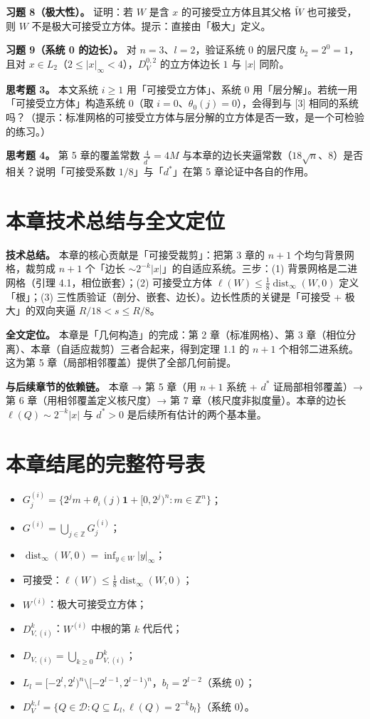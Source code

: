 \documentclass[a4paper,11pt,openany]{ctexbook}
\numberwithin{equation}{chapter}
\numberwithin{figure}{chapter}
\numberwithin{table}{chapter}
\begin{document}
\textbf{习题 8（极大性）。} 证明：若 $W$ 是含 $x$ 的可接受立方体且其父格 $\widetilde W$ 也可接受，则 $W$ 不是极大可接受立方体。提示：直接由「极大」定义。

\textbf{习题 9（系统 0 的边长）。} 对 $n=3$、$l=2$，验证系统 0 的层尺度 $b_2=2^{0}=1$，且对 $x\in L_2$（$2\le|x|_\infty<4$），$D_V^{0,2}$ 的立方体边长 $1$ 与 $|x|$ 同阶。

\textbf{思考题 3。} 本文系统 $i\ge1$ 用「可接受立方体」、系统 0 用「层分解」。若统一用「可接受立方体」构造系统 0（取 $i=0$、$\theta_0(j)=0$），会得到与 [3] 相同的系统吗？（提示：标准网格的可接受立方体与层分解的立方体是否一致，是一个可检验的练习。）

\textbf{思考题 4。} 第 5 章的覆盖常数 $\frac4{d^*}=4M$ 与本章的边长夹逼常数（$18\sqrt n$、$8$）是否相关？说明「可接受系数 $1/8$」与「$d^*$」在第 5 章论证中各自的作用。

\section{本章技术总结与全文定位}

\textbf{技术总结。} 本章的核心贡献是「可接受裁剪」：把第 3 章的 $n+1$ 个均匀背景网格，裁剪成 $n+1$ 个「边长 $\sim2^{-k}|x|$」的自适应系统。三步：(1) 背景网格是二进网格（引理 4.1，相位嵌套）；(2) 可接受立方体 $\ell(W)\le\frac18\operatorname{dist}_\infty(W,0)$ 定义「根」；(3) 三性质验证（剖分、嵌套、边长）。边长性质的关键是「可接受 + 极大」的双向夹逼 $R/18<s\le R/8$。

\textbf{全文定位。} 本章是「几何构造」的完成：第 2 章（标准网格）、第 3 章（相位分离）、本章（自适应裁剪）三者合起来，得到定理 1.1 的 $n+1$ 个相邻二进系统。这为第 5 章（局部相邻覆盖）提供了全部几何前提。

\textbf{与后续章节的依赖链。} 本章 → 第 5 章（用 $n+1$ 系统 + $d^*$ 证局部相邻覆盖）→ 第 6 章（用相邻覆盖定义核尺度）→ 第 7 章（核尺度非拟度量）。本章的边长 $\ell(Q)\sim2^{-k}|x|$ 与 $d^*>0$ 是后续所有估计的两个基本量。

\section{本章结尾的完整符号表}

\begin{itemize}
\item $G_j^{(i)}=\{2^j m+\theta_i(j)\mathbf1+[0,2^j)^n:m\in\mathbb Z^n\}$；
\item $G^{(i)}=\bigcup_{j\in\mathbb Z}G_j^{(i)}$；
\item $\operatorname{dist}_\infty(W,0)=\inf_{y\in W}|y|_\infty$；
\item 可接受：$\ell(W)\le\frac18\operatorname{dist}_\infty(W,0)$；
\item $W^{(i)}$：极大可接受立方体；
\item $D_{V,(i)}^k$：$W^{(i)}$ 中根的第 $k$ 代后代；
\item $D_{V,(i)}=\bigcup_{k\ge0}D_{V,(i)}^k$；
\item $L_l=[-2^l,2^l)^n\setminus[-2^{l-1},2^{l-1})^n$，$b_l=2^{l-2}$（系统 0）；
\item $D_V^{k,l}=\{Q\in\mathcal D:Q\subseteq L_l,\ell(Q)=2^{-k}b_l\}$（系统 0）。
\end{itemize}
\end{document}
